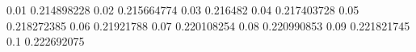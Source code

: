 0.01 0.214898228
0.02 0.215664774
0.03 0.216482
0.04 0.217403728
0.05 0.218272385
0.06 0.21921788
0.07 0.220108254
0.08 0.220990853
0.09 0.221821745
0.1	 0.222692075
